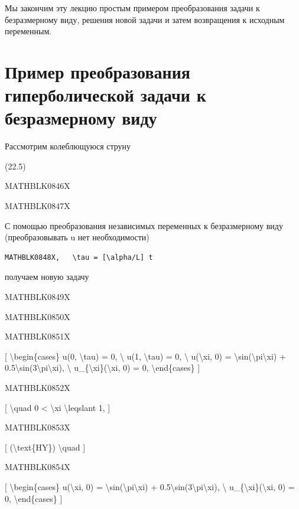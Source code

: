 \documentclass[
]{article}
\begin{document}
Мы закончим эту лекцию простым примером преобразования задачи к
безразмерному виду, решения новой задачи и затем возвращения к исходным
переменным.

\section{Пример преобразования гиперболической задачи к безразмерному
виду}\label{ux43fux440ux438ux43cux435ux440-ux43fux440ux435ux43eux431ux440ux430ux437ux43eux432ux430ux43dux438ux44f-ux433ux438ux43fux435ux440ux431ux43eux43bux438ux447ux435ux441ux43aux43eux439-ux437ux430ux434ux430ux447ux438-ux43a-ux431ux435ux437ux440ux430ux437ux43cux435ux440ux43dux43eux43cux443-ux432ux438ux434ux443}

Рассмотрим колеблющуюся струну

(22.5)

MATHBLK0846X

MATHBLK0847X

С помощью преобразования независимых переменных к безразмерному виду
(преобразовывать u нет необходимости)

\begin{verbatim}
MATHBLK0848X,   \tau = [\alpha/L] t
\end{verbatim}

получаем новую задачу

MATHBLK0849X

MATHBLK0850X

MATHBLK0851X

{[} \textbackslash begin\{cases\} u(0, \textbackslash tau) = 0,
\textbackslash{} u(1, \textbackslash tau) = 0, \textbackslash{}
u(\textbackslash xi, 0) =
\textbackslash sin(\textbackslash pi\textbackslash xi) +
0.5\textbackslash sin(3\textbackslash pi\textbackslash xi),
\textbackslash{} u\_\{\textbackslash xi\}(\textbackslash xi, 0) = 0,
\textbackslash end\{cases\} {]}

MATHBLK0852X

{[} \textbackslash quad 0 \textless{} \textbackslash xi
\textbackslash leqslant 1, {]}

MATHBLK0853X

{[} (\textbackslash text\{HY\}) \textbackslash quad {]}

MATHBLK0854X

{[} \textbackslash begin\{cases\} u(\textbackslash xi, 0) =
\textbackslash sin(\textbackslash pi\textbackslash xi) +
0.5\textbackslash sin(3\textbackslash pi\textbackslash xi),
\textbackslash{} u\_\{\textbackslash xi\}(\textbackslash xi, 0) = 0,
\textbackslash end\{cases\} {]}
\end{document}
